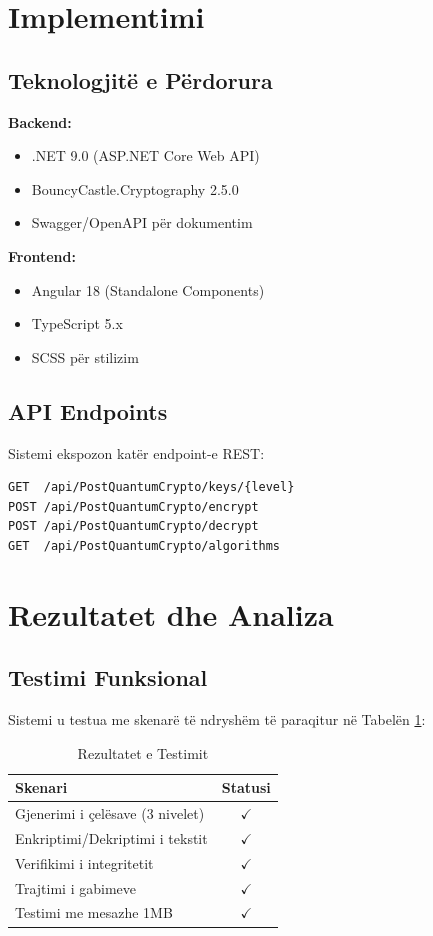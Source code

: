 \documentclass[conference]{IEEEtran}
\begin{document}
\section{Implementimi}

\subsection{Teknologjitë e Përdorura}

\textbf{Backend:}
\begin{itemize}
\item .NET 9.0 (ASP.NET Core Web API)
\item BouncyCastle.Cryptography 2.5.0
\item Swagger/OpenAPI për dokumentim
\end{itemize}

\textbf{Frontend:}
\begin{itemize}
\item Angular 18 (Standalone Components)
\item TypeScript 5.x
\item SCSS për stilizim
\end{itemize}

\subsection{API Endpoints}

Sistemi ekspozon katër endpoint-e REST:

\begin{verbatim}
GET  /api/PostQuantumCrypto/keys/{level}
POST /api/PostQuantumCrypto/encrypt
POST /api/PostQuantumCrypto/decrypt
GET  /api/PostQuantumCrypto/algorithms
\end{verbatim}

\section{Rezultatet dhe Analiza}

\subsection{Testimi Funksional}

Sistemi u testua me skenarë të ndryshëm të paraqitur në Tabelën \ref{tab:testing}:

\begin{table}[htbp]
\caption{Rezultatet e Testimit}
\label{tab:testing}
\begin{center}
\begin{tabular}{|l|c|}
\hline
\textbf{Skenari} & \textbf{Statusi} \\
\hline
Gjenerimi i çelësave (3 nivelet) & $\checkmark$ \\
Enkriptimi/Dekriptimi i tekstit & $\checkmark$ \\
Verifikimi i integritetit & $\checkmark$ \\
Trajtimi i gabimeve & $\checkmark$ \\
Testimi me mesazhe 1MB & $\checkmark$ \\
\hline
\end{tabular}
\end{center}
\end{table}
\end{document}
